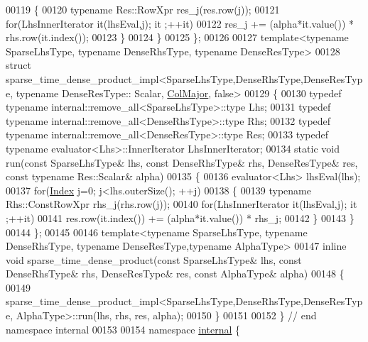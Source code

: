 \begin{DoxyCode}
00119     \{
00120       \textcolor{keyword}{typename} Res::RowXpr res\_j(res.row(j));
00121       \textcolor{keywordflow}{for}(LhsInnerIterator it(lhsEval,j); it ;++it)
00122         res\_j += (alpha*it.value()) * rhs.row(it.index());
00123     \}
00124   \}
00125 \};
00126 
00127 \textcolor{keyword}{template}<\textcolor{keyword}{typename} SparseLhsType, \textcolor{keyword}{typename} DenseRhsType, \textcolor{keyword}{typename} DenseResType>
00128 \textcolor{keyword}{struct }sparse\_time\_dense\_product\_impl<SparseLhsType,DenseRhsType,DenseResType, typename DenseResType::
      Scalar, \hyperlink{group__enums_ggaacded1a18ae58b0f554751f6cdf9eb13a0cbd4bdd0abcfc0224c5fcb5e4f6669a}{ColMajor}, false>
00129 \{
00130   \textcolor{keyword}{typedef} \textcolor{keyword}{typename} internal::remove\_all<SparseLhsType>::type Lhs;
00131   \textcolor{keyword}{typedef} \textcolor{keyword}{typename} internal::remove\_all<DenseRhsType>::type Rhs;
00132   \textcolor{keyword}{typedef} \textcolor{keyword}{typename} internal::remove\_all<DenseResType>::type Res;
00133   \textcolor{keyword}{typedef} \textcolor{keyword}{typename} evaluator<Lhs>::InnerIterator LhsInnerIterator;
00134   \textcolor{keyword}{static} \textcolor{keywordtype}{void} run(\textcolor{keyword}{const} SparseLhsType& lhs, \textcolor{keyword}{const} DenseRhsType& rhs, DenseResType& res, \textcolor{keyword}{const} \textcolor{keyword}{typename} 
      Res::Scalar& alpha)
00135   \{
00136     evaluator<Lhs> lhsEval(lhs);
00137     \textcolor{keywordflow}{for}(\hyperlink{namespace_eigen_a62e77e0933482dafde8fe197d9a2cfde}{Index} j=0; j<lhs.outerSize(); ++j)
00138     \{
00139       \textcolor{keyword}{typename} Rhs::ConstRowXpr rhs\_j(rhs.row(j));
00140       \textcolor{keywordflow}{for}(LhsInnerIterator it(lhsEval,j); it ;++it)
00141         res.row(it.index()) += (alpha*it.value()) * rhs\_j;
00142     \}
00143   \}
00144 \};
00145 
00146 \textcolor{keyword}{template}<\textcolor{keyword}{typename} SparseLhsType, \textcolor{keyword}{typename} DenseRhsType, \textcolor{keyword}{typename} DenseResType,\textcolor{keyword}{typename} AlphaType>
00147 \textcolor{keyword}{inline} \textcolor{keywordtype}{void} sparse\_time\_dense\_product(\textcolor{keyword}{const} SparseLhsType& lhs, \textcolor{keyword}{const} DenseRhsType& rhs, DenseResType& res,
       \textcolor{keyword}{const} AlphaType& alpha)
00148 \{
00149   sparse\_time\_dense\_product\_impl<SparseLhsType,DenseRhsType,DenseResType, AlphaType>::run(lhs, rhs, res, 
      alpha);
00150 \}
00151 
00152 \} \textcolor{comment}{// end namespace internal}
00153 
00154 \textcolor{keyword}{namespace }\hyperlink{namespaceinternal}{internal} \{

\end{DoxyCode}
